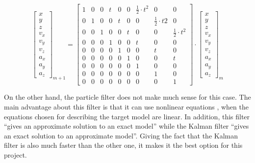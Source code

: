 \begin{equation}
\begin{bmatrix}
x \\ y \\ z \\ v_{x} \\ v_{y} \\ v_{z} \\ a_{x} \\ a_{y} \\ a_{z}
\end{bmatrix}_{m+1}
=
\begin{bmatrix}
1 & 0 & 0 & t & 0 & 0 & \frac{1}{2} \cdot t^{2} & 0 & 0 \\
0 & 1 & 0 & 0 & t & 0 & 0 & \frac{1}{2} \cdot t{2} & 0 \\
0 & 0 & 1 & 0 & 0 & t & 0 & 0 & \frac{1}{2} \cdot t^{2}	\\
0 & 0 & 0 & 1 & 0 & 0 & t & 0 & 0 \\
0 & 0 & 0 & 0 & 1 & 0 & 0 & t & 0 \\
0 & 0 & 0 & 0 & 0 & 1 & 0 & 0 & t \\
0 & 0 & 0 & 0 & 0 & 0 & 1 & 0 & 0 \\
0 & 0 & 0 & 0 & 0 & 0 & 0 & 1 & 0 \\
0 & 0 & 0 & 0 & 0 & 0 & 0 & 0 & 1
\end{bmatrix}
\cdot
\begin{bmatrix}
x \\ y \\ z \\ v_{x} \\ v_{y} \\ v_{z} \\ a_{x} \\ a_{y} \\ a_{z}
\end{bmatrix}_{m}
\label{eq:motion_mat}
\end{equation}

On the other hand, the particle filter does not make much sense for this case. The main advantage about this filter is that it can use nonlinear equations \cite{kalman_lectures}, when the equations chosen for describing the target model are linear. In addition, this filter ``gives an approximate solution to an exact model'' while the Kalman filter ``gives an exact solution to an approximate model''. Giving the fact that the Kalman filter is also much faster than the other one, it makes it the best option for this project.

